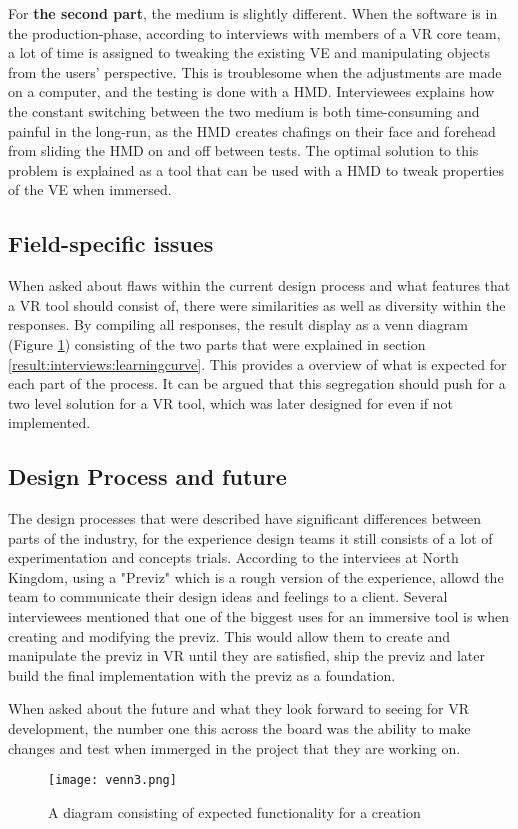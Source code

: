  For \textbf{the second part}, the medium is slightly different. When the software is in the production-phase, according to interviews with members of a VR core team, a lot of time is assigned to tweaking the existing VE and manipulating objects from the users' perspective. This is troublesome when the adjustments are made on a computer, and the testing is done with a HMD. Interviewees explains how the constant switching between the two medium is both time-consuming and painful in the long-run, as the HMD creates chafings on their face and forehead from sliding the HMD on and off between tests. The optimal solution to this problem is explained as a tool that can be used with a HMD to tweak properties of the VE when immersed.
\subsection{Field-specific issues}
When asked about flaws within the current design process and what features that a VR tool should consist of, there were similarities as well as diversity within the responses. By compiling all responses, the result display as a venn diagram (Figure \ref{fig:result:interview:venn}) consisting of the two parts that were explained in section \ref{result:interviews:learningcurve}. This provides a overview of what is expected for each part of the process. It can be argued that this segregation should push for a two level solution for a VR tool, which was later designed for even if not implemented.
\subsection{Design Process and future}
The design processes that were described have significant differences between parts of the industry, for the experience design teams it still consists of a lot of experimentation and concepts trials. According to the interviees at North Kingdom, using a "Previz" which is a rough version of the experience, allowd the team to communicate their design ideas and feelings to a client. Several interviewees mentioned that one of the biggest uses for an immersive tool is when creating and modifying the previz. This would allow them to create and manipulate the previz in VR until they are satisfied, ship the previz and later build the final implementation with the previz as a foundation.

When asked about the future and what they look forward to seeing for VR development, the number one this across the board was the ability to make changes and test when immerged in the project that they are working on.
\begin{figure}
  \texttt{[image: venn3.png]}
  \caption{A diagram consisting of expected functionality for a creation}
  \label{fig:result:interview:venn}
\end{figure}
